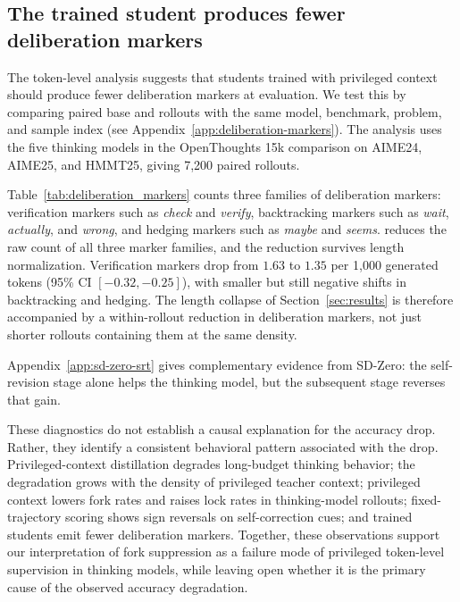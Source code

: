 \subsection{The trained student produces fewer deliberation markers}
\label{sec:trained-student-deliberation}

The token-level analysis suggests that students trained with privileged context
should produce fewer deliberation markers at evaluation. We test this by
comparing paired base and \opsd{} rollouts with the same model, benchmark,
problem, and sample index (see Appendix~\ref{app:deliberation-markers}). The
analysis uses the five thinking models in the OpenThoughts 15k comparison on
AIME24, AIME25, and HMMT25, giving 7,200 paired rollouts.



Table~\ref{tab:deliberation_markers} counts three families of deliberation
markers: verification markers such as \textit{check} and \textit{verify},
backtracking markers such as \textit{wait}, \textit{actually}, and
\textit{wrong}, and hedging markers such as \textit{maybe} and
\textit{seems}. \opsd{} reduces the raw count of all three marker families, and
the reduction survives length normalization. Verification markers drop from
$1.63$ to $1.35$ per 1,000 generated tokens (95\% CI $[-0.32,-0.25]$), with
smaller but still negative shifts in backtracking and hedging. The length
collapse of Section~\ref{sec:results} is therefore accompanied by a
within-rollout reduction in deliberation markers, not just shorter rollouts
containing them at the same density.

Appendix~\ref{app:sd-zero-srt} gives complementary evidence from SD-Zero: the
self-revision stage alone helps the thinking model, but the subsequent \opsd{}
stage reverses that gain.

These diagnostics do not establish a causal explanation for the accuracy drop.
Rather, they identify a consistent behavioral pattern associated with the drop.
Privileged-context distillation degrades long-budget thinking behavior; the
degradation grows with the density of privileged teacher context; privileged
context lowers fork rates and raises lock rates in thinking-model rollouts;
fixed-trajectory scoring shows sign reversals on self-correction cues; and
trained students emit fewer deliberation markers. Together, these observations
support our interpretation of fork suppression as a failure mode of privileged
token-level supervision in thinking models, while leaving open whether it is the
primary cause of the observed accuracy degradation.
